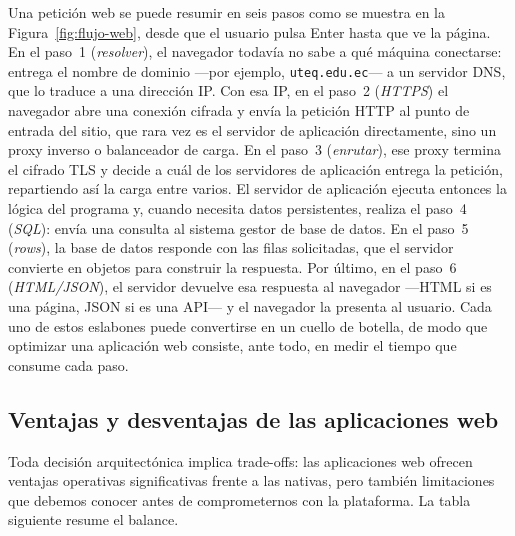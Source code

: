 Una petición web se puede resumir en seis pasos como se muestra en la Figura~\ref{fig:flujo-web}, desde que el usuario pulsa Enter hasta que ve la página. En el paso~1 (\emph{resolver}), el navegador todavía no sabe a qué máquina conectarse: entrega el nombre de dominio ---por ejemplo, \texttt{uteq.edu.ec}--- a un servidor DNS, que lo traduce a una dirección IP. Con esa IP, en el paso~2 (\emph{HTTPS}) el navegador abre una conexión cifrada y envía la petición HTTP al punto de entrada del sitio, que rara vez es el servidor de aplicación directamente, sino un proxy inverso o balanceador de carga. En el paso~3 (\emph{enrutar}), ese proxy termina el cifrado TLS y decide a cuál de los servidores de aplicación entrega la petición, repartiendo así la carga entre varios. El servidor de aplicación ejecuta entonces la lógica del programa y, cuando necesita datos persistentes, realiza el paso~4 (\emph{SQL}): envía una consulta al sistema gestor de base de datos. En el paso~5 (\emph{rows}), la base de datos responde con las filas solicitadas, que el servidor convierte en objetos para construir la respuesta. Por último, en el paso~6
(\emph{HTML/JSON}), el servidor devuelve esa respuesta al navegador ---HTML si es una página, JSON si es una API--- y el navegador la presenta al usuario. Cada uno de estos eslabones puede convertirse en un cuello de botella, de modo que optimizar una aplicación web consiste, ante todo, en medir el tiempo que consume cada paso.

\subsection{Ventajas y desventajas de las aplicaciones web}

Toda decisión arquitectónica implica trade-offs: las aplicaciones
web ofrecen ventajas operativas significativas frente a las nativas,
pero también limitaciones que debemos conocer antes de comprometernos
con la plataforma. La tabla siguiente resume el balance.


